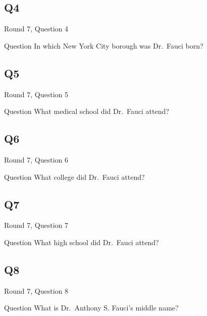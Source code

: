 \documentclass[11pt]{beamer}
\begin{document}
\subsection*{Q4}
\begin{frame}[t]{Round 7, Question 4}
\vspace{0.5em}
\begin{block}{Question}
In which New York City borough was Dr.\ Fauci born?
\end{block}
\end{frame}
    

\subsection*{Q5}
\begin{frame}[t]{Round 7, Question 5}
\vspace{0.5em}
\begin{block}{Question}
What medical school did Dr.\ Fauci attend?
\end{block}
\end{frame}
    

\subsection*{Q6}
\begin{frame}[t]{Round 7, Question 6}
\vspace{0.5em}
\begin{block}{Question}
What college did Dr.\ Fauci attend?
\end{block}
\end{frame}
    

\subsection*{Q7}
\begin{frame}[t]{Round 7, Question 7}
\vspace{0.5em}
\begin{block}{Question}
What high school did Dr.\ Fauci attend?
\end{block}
\end{frame}
    

\subsection*{Q8}
\begin{frame}[t]{Round 7, Question 8}
\vspace{0.5em}
\begin{block}{Question}
What is Dr.\ Anthony S. Fauci's middle name?
\end{block}
\end{frame}
    
\end{document}
